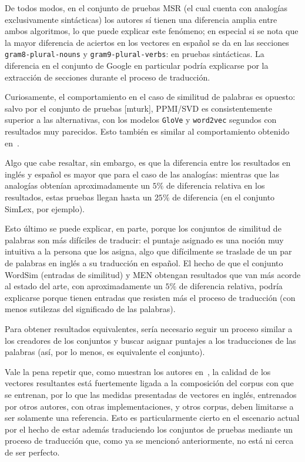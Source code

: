 De todos modos, en el conjunto de pruebas MSR (el cual cuenta con analogías exclusivamente
sintácticas) los autores sí tienen una diferencia amplia entre ambos algoritmos, lo que puede
explicar este fenómeno; en especial si se nota que la mayor diferencia de aciertos en los vectores
en español se da en las secciones \texttt{gram8-plural-nouns} y \texttt{gram9-plural-verbs}: en
pruebas sintácticas. La diferencia en el conjunto de Google en particular podría explicarse por la
extracción de secciones durante el proceso de traducción.


Curiosamente, el comportamiento en el caso de similitud de palabras es opuesto: salvo por el
conjunto de pruebas [mturk], PPMI/SVD es consistentemente superior a las alternativas, con
los modelos \texttt{GloVe} y \texttt{word2vec} segundos con resultados muy parecidos. Esto también
es similar al comportamiento obtenido en~\cite{Levy2015}.

Algo que cabe resaltar, sin embargo, es que la diferencia entre los resultados en inglés y español
es mayor que para el caso de las analogías: mientras que las analogías obtenían aproximadamente un
$5\%$ de diferencia relativa en los resultados, estas pruebas llegan hasta un $25\%$ de diferencia
(en el conjunto SimLex, por ejemplo).

Esto último se puede explicar, en parte, porque los conjuntos de similitud de palabras son más
difíciles de traducir: el puntaje asignado es una noción muy intuitiva a la persona que los asigna,
algo que difícilmente se traslade de un par de palabras en inglés a su traducción en español. El
hecho de que el conjunto WordSim (entradas de similitud) y MEN obtengan resultados que van más
acorde al estado del arte, con aproximadamente un $5\%$ de diferencia relativa, podría explicarse
porque tienen entradas que resisten más el proceso de traducción (con menos sutilezas del
significado de las palabras).

Para obtener resultados equivalentes, sería necesario seguir un proceso similar a los creadores de
los conjuntos y buscar asignar puntajes a los traducciones de las palabras (así, por lo menos, es
equivalente el conjunto).


Vale la pena repetir que, como muestran los autores en~\cite{Levy2015}, la calidad de los vectores
resultantes está fuertemente ligada a la composición del corpus con que se entrenan, por lo que las
medidas presentadas de vectores en inglés, entrenados por otros autores, con otras implementaciones,
y otros corpus, deben limitarse a ser solamente una referencia. Esto es particularmente cierto en el
escenario actual por el hecho de estar además traduciendo los conjuntos de pruebas mediante un
proceso de traducción que, como ya se mencionó anteriormente, no está ni cerca de ser perfecto.


